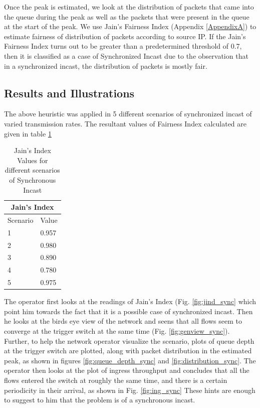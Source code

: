 Once the peak is estimated, we look at the distribution of packets that came into the queue during the peak
as well as the packets that were present in the queue at the start of the peak.
We use Jain's Fairness Index (Appendix \ref{AppendixA}) to estimate fairness of distribution of packets according to source IP.
If the Jain's Fairness Index turns out to be greater than a predetermined threshold of 0.7, then it is classified as a case of 
Synchronized Incast due to the observation that in a synchronized incast, the distribution of packets is mostly fair.
\subsection{Results and Illustrations}
The above heuristic was applied in 5 different scenarios of synchronized incast of varied transmission rates.
The resultant values of Fairness Index calculated are given in table \ref{tab:J_Index_Sync}
\begin{table}[h]
\begin{center}
\begin{tabular}{ |p{3cm}|p{3cm}|  }
	\hline
	\multicolumn{2}{|c|}{Jain's Index} \\
	\hline
	Scenario & Value \\
	\hline
	1 & 0.957 \\
	2 & 0.980 \\
	3 & 0.890 \\
	4 & 0.780 \\
	5 & 0.975 \\
	\hline
   \end{tabular}
\end{center}

\caption{Jain's Index Values for different scenarios of Synchronous Incast}
\label{tab:J_Index_Sync}
\end{table}
The operator first looks at the readings of Jain's Index (Fig. \ref{fig:jind_sync} which point him towards the fact that it is a possible
case of synchronized incast.
Then he looks at the birds eye view of the network and seens that all flows seem to converge at the trigger switch at the same time (Fig. \ref{fig:genview_sync}).
Further, to help the network operator visualize the scenario, plots of queue depth at the
trigger switch are plotted, along with packet distribution in the estimated peak, as shown in figures \ref{fig:queue_depth_sync}
and \ref{fig:distribution_sync}.
The operator then looks at the plot of ingress throughput and concludes that all the flows entered the switch
at roughly the same time, and there is a certain periodicity in their arrival, as shown in Fig. \ref{fig:ing_sync}
These hints are enough to suggest to him that the problem is of a synchronous incast.

